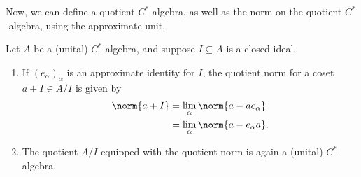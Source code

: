 \documentclass[10pt]{mypackage}
\begin{document}
Now, we can define a quotient $C^{\ast}$-algebra, as well as the norm on the quotient $C^{\ast}$-algebra, using the approximate unit.
\begin{theorem}
  Let $A$ be a (unital) $C^{\ast}$-algebra, and suppose $I\subseteq A$ is a closed ideal.
  \begin{enumerate}[(1)]
    \item If $\left(e_{\alpha}\right)_{\alpha}$ is an approximate identity for $I$, the quotient norm for a coset $a + I\in A/I$ is given by
      \begin{align*}
        \norm{a+I} &= \lim_{\alpha} \norm{a-ae_{\alpha}}\\
                   &= \lim_{\alpha}\norm{a-e_{\alpha}a}.
      \end{align*}
    \item The quotient $A/I$ equipped with the quotient norm is again a (unital) $C^{\ast}$-algebra.
  \end{enumerate}
\end{theorem}
\end{document}
